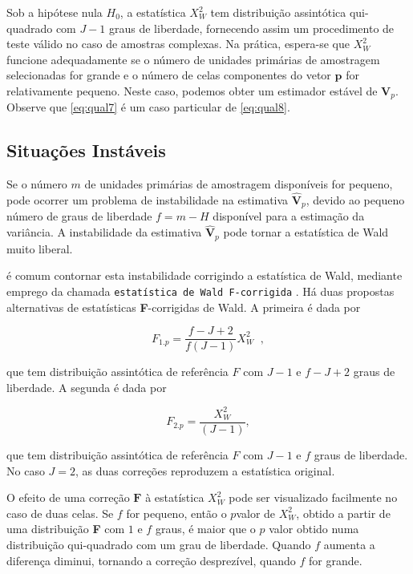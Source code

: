 \documentclass[]{book}
\theoremstyle{definition}
\theoremstyle{definition}
\theoremstyle{definition}
\theoremstyle{remark}
\begin{document}
Sob a hipótese nula \(H_{0}\), a estatística \(X_{W}^{2}\) tem
distribuição assintótica qui-quadrado com \(J-1\) graus de liberdade,
fornecendo assim um procedimento de teste válido no caso de amostras
complexas. Na prática, espera-se que \(X_{W}^{2}\) funcione
adequadamente se o número de unidades primárias de amostragem
selecionadas for grande e o número de celas componentes do vetor
\(\mathbf{p}\) for relativamente pequeno. Neste caso, podemos obter um
estimador estável de \(\mathbf{V}_{p}\). Observe que \eqref{eq:qual7} é um
caso particular de \eqref{eq:qual8}.

\subsection{Situações Instáveis}\label{situacoes-instaveis}

Se o número \(m\) de unidades primárias de amostragem disponíveis for
pequeno, pode ocorrer um problema de instabilidade na estimativa
\(\widehat{\mathbf{V}}_{p}\), devido ao pequeno número de graus de
liberdade \(f=m-H\) disponível para a estimação da variância. A
instabilidade da estimativa \(\widehat{\mathbf{V}}_{p}\) pode tornar a
estatística de Wald muito liberal.

é comum contornar esta instabilidade corrigindo a estatística de Wald,
mediante emprego da chamada \texttt{estatística\ de\ Wald\ F-corrigida}
. Há duas propostas alternativas de estatísticas \textbf{F}-corrigidas
de Wald. A primeira é dada por

\begin{equation}
F_{1.p}=\frac{f-J+2}{f\left( J-1\right) }X_{W}^{2}\;\;,  
\label{eq:qual9}
\end{equation}

que tem distribuição assintótica de referência \(F\) com \(J-1\) e
\(f-J+2\) graus de liberdade. A segunda é dada por

\begin{equation}
F_{2.p}=\frac{X_{W}^{2}}{\left( J-1\right) },  
\label{eq:qual10}
\end{equation}

que tem distribuição assintótica de referência \(F\) com \(J-1\) e \(f\)
graus de liberdade. No caso \(J=2\), as duas correções reproduzem a
estatística original.

O efeito de uma correção \(\mathbf{F}\) à estatística \(X_{W}^{2}\) pode
ser visualizado facilmente no caso de duas celas. Se \(f\) for pequeno,
então o \(p\)valor de \(X_{W}^{2}\), obtido a partir de uma distribuição
\textbf{F} com \(1\) e \(f\) graus, é maior que o \(p\) valor obtido
numa distribuição qui-quadrado com um grau de liberdade. Quando \(f\)
aumenta a diferença diminui, tornando a correção desprezível, quando
\(f\) for grande.
\end{document}
